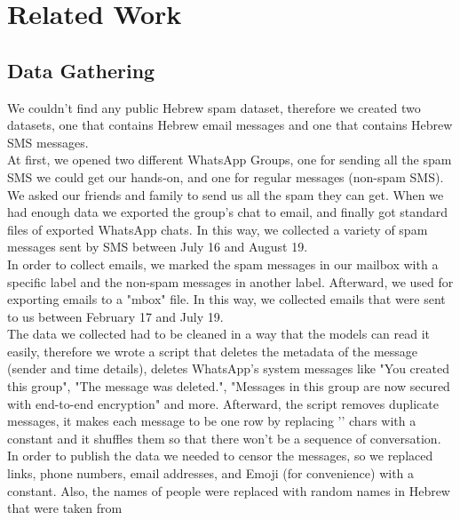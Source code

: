\documentclass[11pt,a4paper]{article}
\begin{document}
\section{Related Work}
\subsection{Data Gathering}
\label{ssec:Data Gathering}
We couldn't find any public Hebrew spam dataset, therefore we created two datasets, one that contains Hebrew email messages and one that contains Hebrew SMS messages.\\
At first, we opened two different WhatsApp Groups, one for sending all the spam SMS we could get our hands-on, and one for regular messages (non-spam SMS). We asked our friends and family to send us all the spam they can get. When we had enough data we exported the group's chat to email, and finally got standard files of exported WhatsApp chats.
In this way, we collected a variety of spam messages sent by SMS between July 16 and August 19. \\
In order to collect emails, we marked the spam messages in our mailbox with a specific label and the non-spam messages in another label. Afterward, we used \citep{lnk} for exporting emails to a "mbox" file. 
In this way, we collected emails that were sent to us between February 17 and July 19.\\
The data we collected had to be cleaned in a way that the models can read it easily, therefore we wrote a script that deletes the metadata of the message (sender and time details), deletes WhatsApp's system messages like "You created this group", "The message was deleted.", "Messages in this group are now secured with end-to-end encryption" and more. Afterward, the script removes duplicate messages, it makes each message to be one row by replacing '\n' chars with a constant and it shuffles them so that there won't be a sequence of conversation.\\
In order to publish the data we needed to censor the messages, so we replaced links, phone numbers, email addresses, and Emoji (for convenience) with a constant. Also, the names of people were replaced with random names in Hebrew that were taken from \citep{lnk2}
\end{document}
